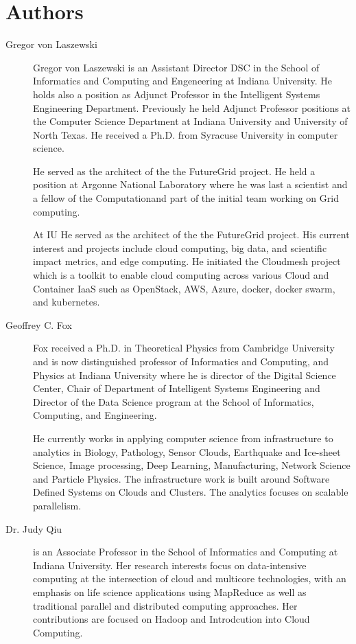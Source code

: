 \section{Authors}

\FILENAME

\begin{description}

\item[Gregor von Laszewski] Gregor von Laszewski is an Assistant
  Director DSC in the School of Informatics and Computing and
  Engeneering at Indiana University. He holds also a position as
  Adjunct Professor in the Intelligent Systems Engineering
  Department. Previously he held Adjunct Professor positions at the
  Computer Science Department at Indiana University and University of
  North Texas. He received a Ph.D. from Syracuse University in
  computer science.

  He served as the architect of the the FutureGrid project. He held a
  position at Argonne National Laboratory where he was last a
  scientist and a fellow of the Computationand part of the initial
  team working on Grid computing.

  At IU He served as the architect of the the FutureGrid project. His
  current interest and projects include cloud computing, big data, and
  scientific impact metrics, and edge computing.  He initiated the
  Cloudmesh project which is a toolkit to enable cloud computing
  across various Cloud and Container IaaS such as OpenStack, AWS,
  Azure, docker, docker swarm, and kubernetes.


\item[Geoffrey C. Fox] Fox received a Ph.D. in Theoretical Physics
  from Cambridge University and is now distinguished professor of
  Informatics and Computing, and Physics at Indiana University where
  he is director of the Digital Science Center, Chair of Department of
  Intelligent Systems Engineering and Director of the Data Science
  program at the School of Informatics, Computing, and Engineering.

  He currently works in applying computer science from infrastructure
  to analytics in Biology, Pathology, Sensor Clouds, Earthquake and
  Ice-sheet Science, Image processing, Deep Learning, Manufacturing,
  Network Science and Particle Physics. The infrastructure work is
  built around Software Defined Systems on Clouds and Clusters. The
  analytics focuses on scalable parallelism.

\item [Dr. Judy Qiu] is an Associate Professor in the School of
  Informatics and Computing at Indiana University. Her research
  interests focus on data-intensive computing at the intersection of
  cloud and multicore technologies, with an emphasis on life science
  applications using MapReduce as well as traditional parallel and
  distributed computing approaches. Her contributions are focused on
  Hadoop and Introdcution into Cloud Computing. 

\end{description}

